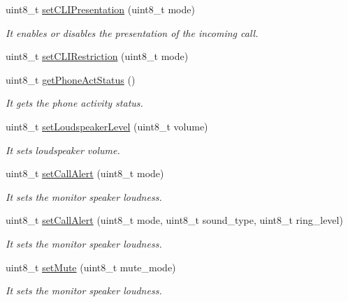 \begin{DoxyCompactItemize}
uint8\+\_\+t \hyperlink{class_wasp_g_p_r_s___pro__core_a6418600f64377c34f5427610e2353937}{set\+C\+L\+I\+Presentation} (uint8\+\_\+t mode)
\begin{DoxyCompactList}\small\item\em It enables or disables the presentation of the incoming call. \end{DoxyCompactList}\item 
uint8\+\_\+t \hyperlink{class_wasp_g_p_r_s___pro__core_ab36cc06a602bd23476363d153f0f134a}{set\+C\+L\+I\+Restriction} (uint8\+\_\+t mode)
\item 
uint8\+\_\+t \hyperlink{class_wasp_g_p_r_s___pro__core_ab3ed9d83eff59be5783422f51651a0c4}{get\+Phone\+Act\+Status} ()
\begin{DoxyCompactList}\small\item\em It gets the phone activity status. \end{DoxyCompactList}\item 
uint8\+\_\+t \hyperlink{class_wasp_g_p_r_s___pro__core_a9390d09a69c3d60936e9f063d6ff9dc5}{set\+Loudspeaker\+Level} (uint8\+\_\+t volume)
\begin{DoxyCompactList}\small\item\em It sets loudspeaker volume. \end{DoxyCompactList}\item 
uint8\+\_\+t \hyperlink{class_wasp_g_p_r_s___pro__core_a4b79b34af0bfff9398fdd36d8d877029}{set\+Call\+Alert} (uint8\+\_\+t mode)
\begin{DoxyCompactList}\small\item\em It sets the monitor speaker loudness. \end{DoxyCompactList}\item 
uint8\+\_\+t \hyperlink{class_wasp_g_p_r_s___pro__core_a947b8feec066d896d4cd5c474677d7a1}{set\+Call\+Alert} (uint8\+\_\+t mode, uint8\+\_\+t sound\+\_\+type, uint8\+\_\+t ring\+\_\+level)
\begin{DoxyCompactList}\small\item\em It sets the monitor speaker loudness. \end{DoxyCompactList}\item 
uint8\+\_\+t \hyperlink{class_wasp_g_p_r_s___pro__core_a599548823bcc1931c2854d7622890d5c}{set\+Mute} (uint8\+\_\+t mute\+\_\+mode)
\begin{DoxyCompactList}\small\item\em It sets the monitor speaker loudness. \end{DoxyCompactList}\item 

\end{DoxyCompactItemize}
